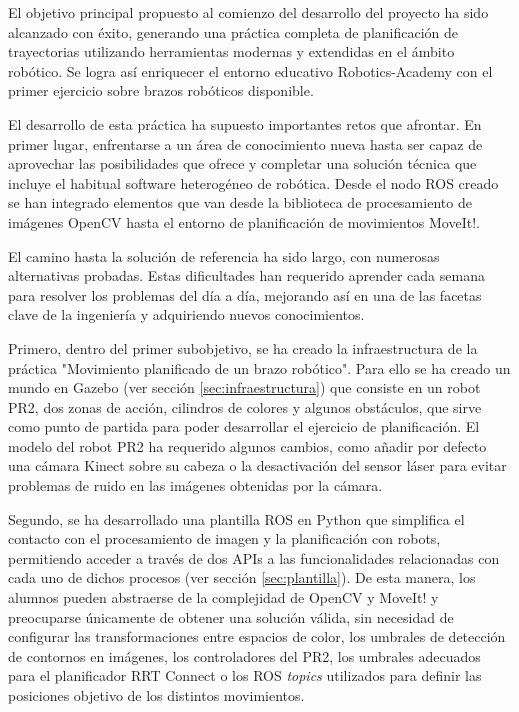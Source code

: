 \documentclass[12pt,spanish,chapterprefix, numbers=noenddot]{book}
\numberwithin{equation}{section}
\numberwithin{figure}{section}
\begin{document}
El objetivo principal propuesto al comienzo del desarrollo del proyecto ha sido alcanzado con éxito, generando una práctica completa de planificación de trayectorias utilizando herramientas modernas y extendidas en el ámbito robótico. Se logra así enriquecer el entorno educativo Robotics-Academy con el primer ejercicio sobre brazos robóticos disponible. 

El desarrollo de esta práctica ha supuesto importantes retos que afrontar. En primer lugar, enfrentarse a un área de conocimiento nueva hasta ser capaz de aprovechar las posibilidades que ofrece y completar una solución técnica que incluye el habitual software heterogéneo de robótica. Desde el nodo ROS creado se han integrado elementos que van desde la biblioteca de procesamiento de imágenes OpenCV hasta el entorno de planificación de movimientos MoveIt!.

El camino hasta la solución de referencia ha sido largo, con numerosas alternativas probadas. Estas dificultades han requerido aprender cada semana para resolver los problemas del día a día, mejorando así en una de las facetas clave de la ingeniería y adquiriendo nuevos conocimientos.

Primero, dentro del primer subobjetivo, se ha creado la infraestructura de la práctica "Movimiento planificado de un brazo robótico". Para ello se ha creado un mundo en Gazebo (ver sección \ref{sec:infraestructura}) que consiste en un robot PR2, dos zonas de acción, cilindros de colores y algunos obstáculos, que sirve como punto de partida para poder desarrollar el ejercicio de planificación. El modelo del robot PR2 ha requerido algunos cambios, como añadir por defecto una cámara Kinect sobre su cabeza o la desactivación del sensor láser para evitar problemas de ruido en las imágenes obtenidas por la cámara. 

Segundo, se ha desarrollado una plantilla ROS en Python que simplifica el contacto con el procesamiento de imagen y la planificación con robots, permitiendo acceder a través de dos APIs a las funcionalidades relacionadas con cada uno de dichos procesos (ver sección \ref{sec:plantilla}). De esta manera, los alumnos pueden abstraerse de la complejidad de OpenCV y MoveIt! y preocuparse únicamente de obtener una solución válida, sin necesidad de configurar las transformaciones entre espacios de color, los umbrales de detección de contornos en imágenes, los controladores del PR2, los umbrales adecuados para el planificador RRT Connect o los ROS \textit{topics} utilizados para definir las posiciones objetivo de los distintos movimientos.
\end{document}
